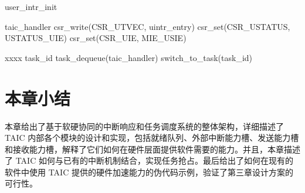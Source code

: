 \begin{algorithm}[!ht]
  \caption{user\_intr\_init}
  \label{alg:uintr}
  \begin{algorithmic}[1]
    \State taic\_handler
      \State csr\_write(CSR\_UTVEC, uintr\_entry) 
      \State csr\_set(CSR\_USTATUS, USTATUS\_UIE) 
      \State csr\_set(CSR\_UIE, MIE\_USIE) 
    \EndFunction

      \State xxxx 
      \State task\_id \gets task\_dequeue(taic\_handler) 
      \State switch\_to\_task(task\_id) 
    \EndFunction
  \end{algorithmic}
\end{algorithm}

\section{本章小结}

本章给出了基于软硬协同的中断响应和任务调度系统的整体架构，详细描述了 TAIC 内部各个模块的设计和实现，包括就绪队列、外部中断能力槽、发送能力槽和接收能力槽，解释了它们如何在硬件层面提供软件需要的能力。并且，本章描述了 TAIC 如何与已有的中断机制结合，实现任务抢占。最后给出了如何在现有的软件中使用 TAIC 提供的硬件加速能力的伪代码示例，验证了第三章设计方案的可行性。
